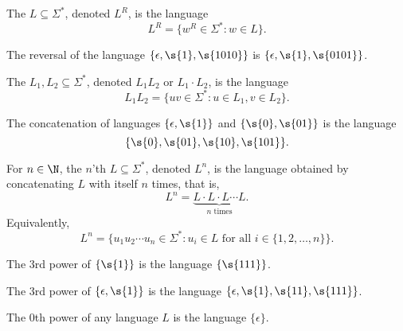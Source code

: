 \begin{flex}
\begin{definition} \label{definition:Reversal-of-a-language}
The  $L \subseteq \Sigma^*$, denoted $L^R$, is the language
\[
    L^R = \{w^R \in \Sigma^* : w \in L\}. 
\]
\end{definition}
\begin{example} \label{example:Reversal-of-epsilon-1-1010}
The reversal of the language $\{\epsilon, \s{1}, \s{1010}\}$ is $\{\epsilon, \s{1}, \s{0101}\}$.
\end{example}
\end{flex}


\begin{flex}
\begin{definition} \label{definition:Concatenation-of-languages}
The  $L_1, L_2 \subseteq \Sigma^*$, denoted $L_1L_2$ or $L_1 \cdot L_2$, is the language
\[
    L_1L_2 = \{uv \in \Sigma^* : u \in L_1, v \in L_2\}.
\]
\end{definition}

\begin{example} \label{example:Concatenation-of-epsilon-1-and-0-01}
The concatenation of languages $\{\epsilon, \s{1}\}$ and $\{\s{0}, \s{01}\}$ is the language
\[
    \{\s{0}, \s{01}, \s{10}, \s{101}\}.
\] 
\end{example}
\end{flex}


\begin{flex}
\begin{definition} \label{definition:Powers-of-a-language}
For $n \in \N$, the $n$'th  $L \subseteq \Sigma^*$, denoted $L^n$, is the language obtained by concatenating $L$ with itself $n$ times, that is,
\[
    L^n = \underbrace{L \cdot L \cdot L \cdots L}_{n \text{ times}}.
\]
Equivalently, 
\[
    L^n = \{u_1u_2\cdots u_n \in \Sigma^* : u_i \in L \text{ for all } i \in \{1,2,\ldots,n\}\}.
\] 
\end{definition}

\begin{example}[$\{1\}^3$] \label{example:13}
The 3rd power of $\{\s{1}\}$ is the language $\{\s{111}\}$.
\end{example}

\begin{example}[$\{\epsilon, 1\}^3$] \label{example:epsilon-13}
The 3rd power of $\{\epsilon, \s{1}\}$ is the language $\{\epsilon, \s{1}, \s{11}, \s{111}\}$.
\end{example}

\begin{example}[$L^0$] \label{example:L0}
The 0th power of any language $L$ is the language $\{\epsilon\}$.
\end{example}
\end{flex}


